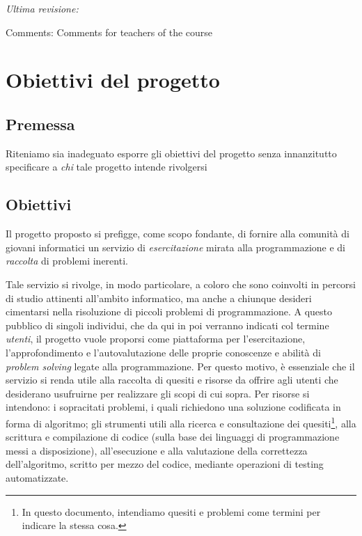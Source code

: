 \documentclass[11pt, a4paper]{article}
\newcommand{\comments}{Comments for teachers of the course}
\begin{document}
\begin{titlepage}


\vfill\vfill
\textit{Ultima revisione:}
{\@date}
\vfill\vfill\vfill

\footnotesize{Comments: \comments}


\end{titlepage}


\tableofcontents

\newpage
\section{Obiettivi del progetto}
\subsection{Premessa}
Riteniamo sia inadeguato esporre gli obiettivi del progetto senza innanzitutto specificare a \textit{chi} tale progetto intende rivolgersi

\subsection{Obiettivi}
Il progetto proposto si prefigge, come scopo fondante, di fornire alla comunità di giovani informatici un servizio di \textit{esercitazione} mirata alla programmazione e di \textit{raccolta} di problemi inerenti.

Tale servizio si rivolge, in modo particolare, a coloro che sono coinvolti in percorsi di studio attinenti all'ambito informatico, ma anche a chiunque desideri cimentarsi nella risoluzione di piccoli problemi di programmazione. A questo pubblico di singoli individui, che da qui in poi verranno indicati col termine \textit{utenti}, il progetto vuole proporsi come piattaforma per l'esercitazione, l'approfondimento e l'autovalutazione delle proprie conoscenze e abilità di \textit{problem solving}
legate alla programmazione. Per questo motivo, è essenziale che il servizio si renda utile alla raccolta di quesiti e risorse da offrire agli utenti che desiderano usufruirne per realizzare gli scopi di cui sopra. Per risorse si intendono: i sopracitati problemi, i quali richiedono una soluzione codificata in forma di algoritmo;
gli strumenti utili alla ricerca e consultazione dei quesiti\footnote{In questo documento, intendiamo quesiti e problemi come termini per indicare la stessa cosa.}, alla scrittura e compilazione di codice (sulla base dei linguaggi di programmazione messi a disposizione), all'esecuzione e alla valutazione della correttezza dell'algoritmo, scritto per mezzo del codice, mediante operazioni di testing automatizzate.
\end{document}
